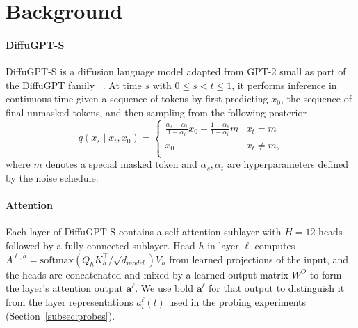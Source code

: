 \documentclass{article} %
\begin{document}

\section{Background}
\paragraph{DiffuGPT-S}
DiffuGPT-S is a diffusion language model adapted from GPT-2 small as part of the DiffuGPT family ~\citep{gong2025scaling}. At time $s$ with $0\le s<t\le 1$, it performs inference in continuous time given a sequence of tokens by first predicting $x_0$, the sequence of final unmasked tokens, and then sampling from the following posterior 
\[ q(x_s \mid x_t, x_0) =\begin{cases}
      \frac{\alpha_s-\alpha_t}{1-\alpha_t}x_0+\frac{1-\alpha_s}{1-\alpha_t}m & x_t=m \\
      x_0 & x_t\ne m \text{,}\\
   \end{cases}
\]
where $m$ denotes a special masked token and $\alpha_s, \alpha_t$ are hyperparameters defined by the noise schedule.

\paragraph{Attention}
Each layer of DiffuGPT-S contains a self-attention sublayer with $H=12$ heads followed by a fully connected sublayer. Head $h$ in layer $\ell$ computes $A^{\ell,h}=\mathrm{softmax}\!\left(Q_hK_h^{\top}/\sqrt{d_{model}}\right)V_h$ from learned projections of the input, and the heads are concatenated and mixed by a learned output matrix $W^O$ to form the layer's attention output $\mathbf{a}^\ell$. We use bold $\mathbf{a}^{\ell}$ for that output to distinguish it from the layer representations $a_i^\ell(t)$ used in the probing experiments (Section~\ref{subsec:probes}).
\end{document}
